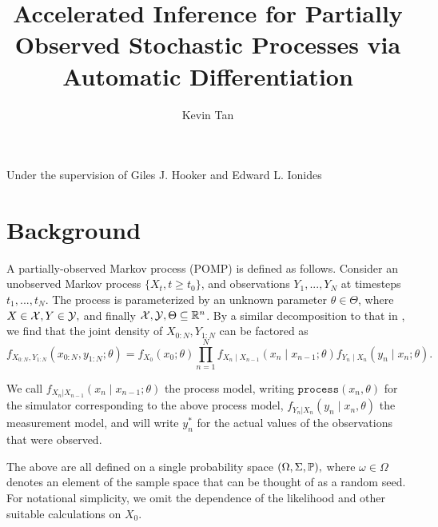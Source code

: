 \documentclass{article}
\title{Accelerated Inference for Partially Observed Stochastic Processes via Automatic Differentiation}
\author{Kevin Tan}
\date{}
\begin{document}
\maketitle

\begin{center}
    Under the supervision of Giles J. Hooker and Edward L. Ionides
\end{center}


\section{Background}
A partially-observed Markov process (POMP) is defined as follows. Consider an unobserved Markov process $\{X_t, t \geq t_0\}$, and observations $Y_1,...,Y_N$ at timesteps $t_1,..., t_N$. The process is parameterized by an unknown parameter $\theta \in \Theta$, where $X \in {\mathcal{X}}, Y \in {\mathcal{Y}},$ and finally ${\mathcal{X}}, {\mathcal{Y}}, \Theta \subseteq \mathbb{R}^n$. By a similar decomposition to that in \citet{doucet2009tutorial}, we find that the joint density of $X_{0:N}, Y_{1:N}$ can be factored as
$$f_{X_{0: N}, Y_{1: N}}\left(x_{0: N}, y_{1: N} ; \theta\right)=f_{X_0}\left(x_0 ; \theta\right) \prod_{n=1}^N f_{X_n \mid X_{n-1}}\left(x_n \mid x_{n-1} ; \theta\right) f_{Y_n \mid X_n}\left(y_n \mid x_n ; \theta\right).$$

We call $f_{X_n|X_{n-1}}\left(x_{n} \mid x_{n-1}; \theta\right)$ the process model, writing $\texttt{process}\left(x_n, \theta\right)$ for the simulator corresponding to the above process model, $f_{Y_n|X_n}\left(y_n \mid x_n, \theta\right)$ the measurement model, and will write $y_n^*$ for the actual values of the observations that were observed.

The above are all defined on a single probability space $(\Omega, \Sigma, \mathbb{P}),$ where $\omega \in \Omega$ denotes an element of the sample space that can be thought of as a random seed. For notational simplicity, we omit the dependence of the likelihood and other suitable calculations on $X_0.$
\end{document}
